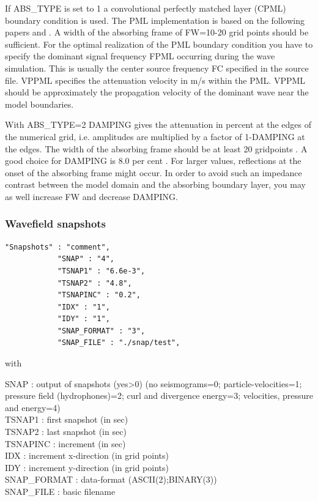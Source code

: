 \documentclass[11pt,onecolumn,oneside]{article}
\begin{document}
If ABS\_TYPE is set to 1 a convolutional perfectly matched layer (CPML) boundary condition is used. The PML implementation is based on the following papers \cite{komatitsch:07} and \cite{martin:09}. A width of the absorbing frame of FW=10-20 grid points should be sufficient. 
For the optimal realization of the PML boundary condition you have to specify the dominant signal frequency FPML occurring during the wave simulation. This is usually the center source frequency FC specified in the source file. VPPML specifies the attenuation velocity in m/s within the PML. VPPML should be approximately the propagation velocity of the dominant wave near the model boundaries.

With ABS\_TYPE=2 
DAMPING gives the attenuation in percent at the edges of the numerical grid, i.e. amplitudes are multiplied by a factor of 1-DAMPING at the edges. The width of the absorbing frame should be at least 20 gridpoints \cite{cerjan:85}. A good choice for DAMPING is 8.0 per cent \cite{cerjan:85}. For larger values, reflections at the onset of the absorbing frame might occur. In order to avoid such an impedance contrast between the model domain and the absorbing boundary layer, you may as well increase FW and decrease DAMPING.


\subsubsection{Wavefield snapshots}
\begin{verbatim}
"Snapshots" : "comment",
			"SNAP" : "4",
			"TSNAP1" : "6.6e-3",
			"TSNAP2" : "4.8",
			"TSNAPINC" : "0.2",
			"IDX" : "1",
			"IDY" : "1",
			"SNAP_FORMAT" : "3",
			"SNAP_FILE" : "./snap/test",
\end{verbatim}

with

SNAP : output of snapshots (yes\textgreater 0) (no seismograms=0; particle-velocities=1; pressure field (hydrophones)=2; curl and divergence energy=3; velocities, pressure and energy=4)\\
TSNAP1 : first snapshot (in sec)\\
TSNAP2 : last snapshot (in sec)\\
TSNAPINC : increment (in sec)\\
IDX : increment x-direction (in grid points)\\
IDY : increment y-direction (in grid points)\\
SNAP\_FORMAT : data-format (ASCII(2);BINARY(3))\\
SNAP\_FILE : basic filename\\
\end{document}
